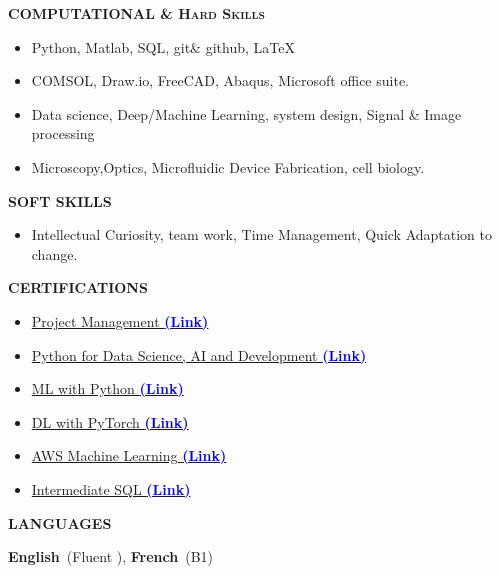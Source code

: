 \documentclass[11pt, a4paper]{article}
\newcommand{\headleft}[1]{\vspace*{3ex}\textsc{\textbf{#1}}\par%
    \vspace*{-1.5ex}\hrulefill\par\vspace*{0.7ex}}
\begin{document}
\begin{minipage}[t]{0.33\textwidth}
{\begin{minipage}[t][293mm][t]{0.82\textwidth}
\headleft{COMPUTATIONAL \& Hard Skills}
\begin{itemize}
\item Python, Matlab, SQL, git\& github, LaTeX
\item COMSOL, Draw.io, FreeCAD, Abaqus, Microsoft office suite.
\item Data science, Deep/Machine Learning, system design, Signal \& Image processing  
\item Microscopy,Optics, Microfluidic Device Fabrication, cell biology.
\end{itemize} 

\headleft{SOFT SKILLS}
\begin{itemize}
\item Intellectual Curiosity, team work, Time Management, Quick Adaptation to change.
\end{itemize}

\headleft{CERTIFICATIONS }
\begin{itemize}
    \item \href{https://coursera.org/verify/WJXNLUPGNS2Y}{Project Management \textbf{\textcolor{blue}{(Link)}}} \\[0.1ex]
    \item \href{https://www.credly.com/badges/f0f17053-9e51-4f96-b711-8bfe00218f69/public_url}{Python for Data Science, AI and Development \textbf{\textcolor{blue}{(Link)}}} \\[0.1ex]
    \item \href{https://www.credly.com/badges/62470371-fbf7-4621-a1d5-c3de722c9895/public_url}{ML with Python \textbf{\textcolor{blue}{(Link)}}} \\[0.1ex]
    \item \href{https://www.coursera.org/account/accomplishments/certificate/JJCXK62SS66L}{DL with PyTorch \textbf{\textcolor{blue}{(Link)}}} \\[0.1ex]
    \item \href{https://coursera.org/share/5fac1241fe53b7b070c15fde163c8b37}{AWS Machine Learning \textbf{\textcolor{blue}{(Link)}}} \\[0.1ex]
    \item \href{https://rb.gy/mjis05}{Intermediate SQL \textbf{\textcolor{blue}{(Link)}}} \\[0.1ex]
\end{itemize}

\headleft{LANGUAGES}
 \textbf{English}~(Fluent ), \textbf{French}~(B1)
 

\end{minipage}}
\end{minipage}
\end{document}
